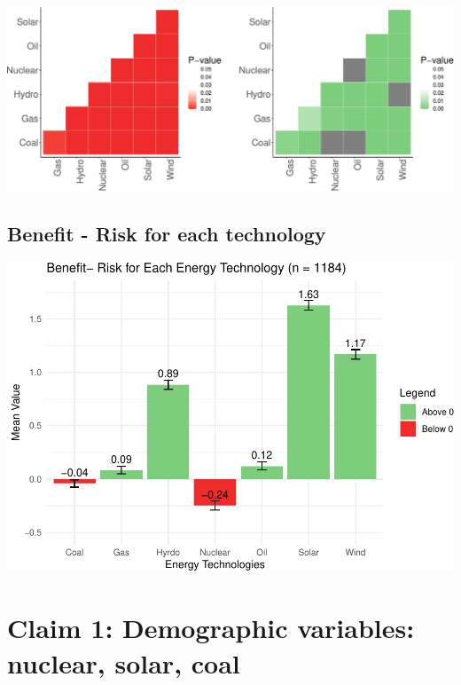 \documentclass[
]{article}
\begin{document}
\includegraphics{nuclear-in-comparison_files/figure-latex/unnamed-chunk-9-1.pdf}

\newpage

\hypertarget{benefit---risk-for-each-technology}{%
\subsection{Benefit - Risk for each
technology}\label{benefit---risk-for-each-technology}}

\includegraphics{nuclear-in-comparison_files/figure-latex/unnamed-chunk-10-1.pdf}

\newpage

\hypertarget{claim-1-demographic-variables-nuclear-solar-coal}{%
\section{Claim 1: Demographic variables: nuclear, solar,
coal}\label{claim-1-demographic-variables-nuclear-solar-coal}}
\end{document}
